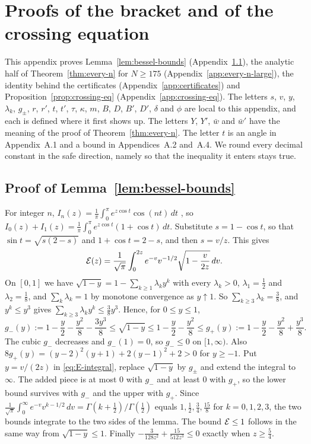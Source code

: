 \section{Proofs of the bracket and of the crossing equation}\label{app:every-n}

This appendix proves Lemma~\ref{lem:bessel-bounds} (Appendix~\ref{app:bessel-bounds}), the analytic half of
Theorem~\ref{thm:every-n} for $N\ge175$ (Appendix~\ref{app:every-n-large}), the identity behind the
certificates (Appendix~\ref{app:certificates}) and Proposition~\ref{prop:crossing-eq} (Appendix~\ref{app:crossing-eq}). The letters $s$, $v$, $y$, $\lambda_k$,
$g_\pm$, $r$, $r'$, $t$, $t'$, $\tau$,
$\kappa$, $m$, $B$, $D$, $B'$, $D'$, $\delta$ and $\phi$ are local to
this appendix, and each is defined where it first shows up. The letters $Y$, $Y'$, $\bar w$ and
$\bar w'$ have the meaning of the proof of Theorem~\ref{thm:every-n}. The letter $t$
is an angle in Appendix~A.1 and a bound in Appendices~A.2 and~A.4.
We round every decimal constant in the safe direction, namely so that the
inequality it enters stays true.

\subsection{Proof of Lemma~\ref{lem:bessel-bounds}}\label{app:bessel-bounds}

For integer $n$, $I_n(z)=\frac1\pi\int_0^\pi e^{z\cos t}\cos(nt)\,dt$
\cite[Eq.~10.32.3]{dlmf}, so
$I_0(z)+I_1(z)=\frac1\pi\int_0^\pi e^{z\cos t}(1+\cos t)\,dt$. Substitute
$s=1-\cos t$, so that $\sin t=\sqrt{s(2-s)}$ and $1+\cos t=2-s$, and then
$s=v/z$. This gives
\begin{equation}\label{eq:E-integral}
\mathcal E(z)=\frac1{\sqrt\pi}\int_0^{2z}e^{-v}v^{-1/2}\sqrt{1-\frac v{2z}}\,dv .
\end{equation}
On $[0,1]$ we have $\sqrt{1-y}=1-\sum_{k\ge1}\lambda_ky^k$ with every $\lambda_k>0$,
$\lambda_1=\frac12$ and $\lambda_2=\frac18$, and $\sum_k\lambda_k=1$ by monotone convergence as
$y\uparrow1$. So $\sum_{k\ge3}\lambda_k=\frac38$, and $y^k\le y^3$ gives
$\sum_{k\ge3}\lambda_ky^k\le\frac38y^3$. Hence, for $0\le y\le1$,
\[
g_-(y):=1-\frac y2-\frac{y^2}8-\frac{3y^3}8\le\sqrt{1-y}\le1-\frac y2-\frac{y^2}8
\le g_+(y):=1-\frac y2-\frac{y^2}8+\frac{y^3}8 .
\]
The cubic $g_-$ decreases and $g_-(1)=0$, so $g_-\le0$ on $[1,\infty)$. Also
$8g_+(y)=(y-2)^2(y+1)+2(y-1)^2+2>0$ for $y\ge-1$. Put $y=v/(2z)$ in
\eqref{eq:E-integral}, replace $\sqrt{1-y}$ by $g_\pm$ and extend the integral
to $\infty$. The added piece is at most $0$ with $g_-$ and at least $0$ with
$g_+$, so the lower bound survives with $g_-$ and the upper with $g_+$. Since
$\frac1{\sqrt\pi}\int_0^\infty e^{-v}v^{k-1/2}\,dv=\Gamma(k+\frac12)/\Gamma(\frac12)$
equals $1,\frac12,\frac34,\frac{15}8$ for $k=0,1,2,3$, the two bounds integrate
to the two sides of the lemma. The bound $\mathcal E\le1$ follows in the same way from
$\sqrt{1-y}\le1$. Finally $-\frac3{128z^2}+\frac{15}{512z^3}\le0$ exactly when
$z\ge\frac54$.

